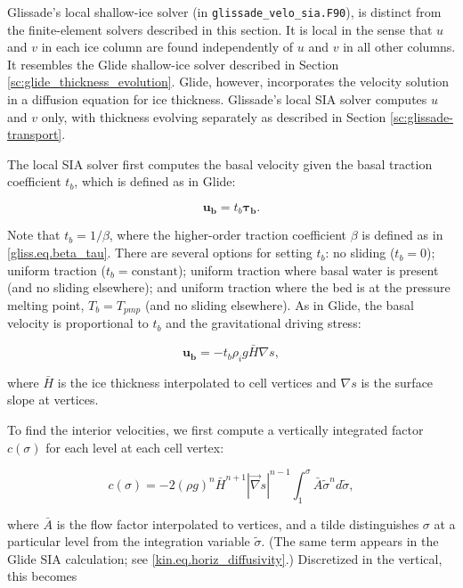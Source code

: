 {Glissade's local shallow-ice solver (in \texttt{glissade\_velo\_sia.F90}),
is distinct from the finite-element solvers described in this section.
It is local in the sense that $u$ and $v$ in each ice column are found independently
of $u$ and $v$ in all other columns.
It resembles the Glide shallow-ice solver described in Section \ref{sc:glide_thickness_evolution}.
Glide, however, incorporates the velocity solution in a diffusion equation for ice thickness.
Glissade's local SIA solver computes $u$ and $v$ only, with
thickness evolving separately as described in Section \ref{sc:glissade-transport}.

The local SIA solver first computes the basal velocity given the basal traction coefficient $t_b$,
which is defined as in Glide:

\begin{equation}
  \mathbf{u_b} = t_b \mathbf{\tau_b}.
\end{equation}

\noindent
Note that $t_b = 1/\beta$, where the higher-order traction coefficient $\beta$ 
is defined as in \eqref{gliss.eq.beta_tau}.
There are several options for setting $t_b$: no sliding ($t_b = 0$);
uniform traction ($t_b = \mathrm{constant}$); uniform traction where basal water is present
(and no sliding elsewhere); and uniform traction where the bed is at the pressure melting point,
$T_b = T_{pmp}$ (and no sliding elsewhere).
As in Glide, the basal velocity is proportional to $t_b$ and the gravitational driving stress:

\begin{equation}
  \label{gliss.eq.velo_bed_sia}
        \mathbf{u_b} = -{{t}_{b}}{{\rho }_{i}} g \bar{H} \nabla s,
\end{equation}

\noindent
where $\bar{H}$ is the ice thickness interpolated to cell vertices
and $\nabla s$ is the surface slope at vertices.

To find the interior velocities, we
first compute a vertically integrated factor $c(\sigma)$ for each level at each cell vertex:

\begin{equation}
  \label{gliss.eq.vert_factor_sia}
  c(\sigma) = -2(\rho g)^n \bar{H}^{n+1} |\vec\nabla s|^{n-1} \int_1^{\sigma} \bar{A} \tilde{\sigma}^n d\tilde{\sigma},
\end{equation}

\noindent
where $\bar{A}$ is the flow factor interpolated to vertices,
and a tilde distinguishes $\sigma$ at a particular level from the integration variable $\tilde{\sigma}$.
(The same term appears in the Glide SIA calculation; see \eqref{kin.eq.horiz_diffusivity}.)
Discretized in the vertical, this becomes

}
